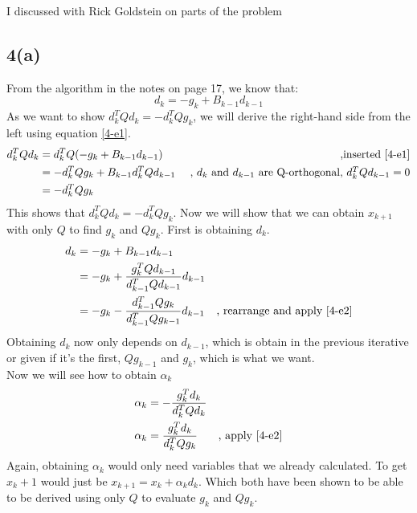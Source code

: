 I discussed with Rick Goldstein on parts of the problem
\subsection*{4(a)}
From the algorithm in the notes on page 17, we know that:
\begin{equation} \label{4-e1}
d_k = -g_k + B_{k-1}d_{k-1}
\end{equation}
As we want to show $d_k^TQd_k = -d_k^TQg_k$, we will derive the right-hand side from the left using equation \ref{4-e1}.
\begin{equation}\label{4-e2}
\begin{aligned}
d_k^TQd_k &= d_k^TQ(-g_k + B_{k-1}d_{k-1}) &\mbox{ ,inserted \ref{4-e1}}\\
&= -d_k^TQg_k +  B_{k-1}d_k^TQd_{k-1} &\mbox{ , $d_k$ and $d_{k-1}$ are Q-orthogonal, $d_k^TQd_{k-1}=0$} \\
&= -d_k^TQg_k
\end{aligned}
\end{equation}
This shows that $d_k^TQd_k = -d_k^TQg_k$. Now we will show that we can obtain $x_{k+1}$ with only $Q$ to find $g_k$ and $Qg_k$.
First is obtaining $d_k$.
\begin{equation}\label{4-e21}
\begin{aligned}
d_k &= - g_k + B_{k-1}d_{k-1}&\\
& = - g_k + \frac{g_k^TQd_{k-1}}{d_{k-1}^TQd_{k-1}} d_{k-1}&\\
& = - g_k - \frac{d_{k-1}^TQg_k}{d_{k-1}^TQg_{k-1}} d_{k-1}& \mbox{, rearrange and apply \ref{4-e2}}
\end{aligned}
\end{equation}
Obtaining $d_k$ now only depends on $d_{k-1}$, which is obtain in the previous iterative or given if it's the first, $Qg_{k-1}$ and $g_k$, which is what we want.\\
Now we will see how to obtain $\alpha_k$
\begin{equation}\label{4-e22}
\begin{aligned}
\alpha_k &= - \frac{g_k^Td_k}{d_k^TQd_k}&\\
\alpha_k &= \frac{g_k^Td_k}{d_k^TQg_k}& \mbox{, apply \ref{4-e2}}\\
\end{aligned}
\end{equation}
Again, obtaining $\alpha_k$ would only need variables that we already calculated. To get $x_k+1$ would just be $x_{k+1} = x_k + \alpha_k d_k$. Which both have been shown to be able to be derived using only $Q$ to evaluate $g_k$ and $Qg_k$.
